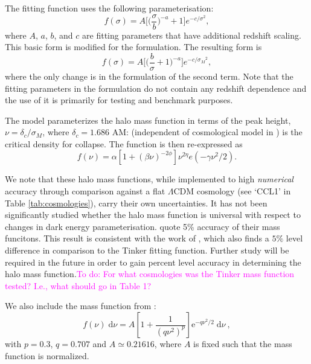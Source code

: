 \documentclass[\docopts]{\docclass}
\newcommand{\todo}[1]{\textcolor{magenta}{To do: #1}}
\newcommand{\elisa}[1]{\textcolor{green!10!orange!90!}{EC: #1}}
\newcommand{\Mead}[1]{\textcolor{red!50!cyan}{AM: #1}}
\begin{document}
The \citet{Tinker2008} fitting function uses the following parameterisation:
\begin{equation}
f(\sigma)=A\Big[\Big(\frac{\sigma}{b}\Big)^{-a}+1\Big]e^{-c/{\sigma}^2},
\end{equation}
where $A$, $a$, $b$, and $c$ are fitting parameters that have additional redshift scaling. This basic form is modified for the \citet{Angulo2012} formulation. The resulting form is
\begin{equation}
f(\sigma)=A\Big[\Big(\frac{b}{\sigma}+1\Big)^{-a}\Big]e^{-c/{\sigma_M}^2},
\end{equation}
where the only change is in the formulation of the second term. Note that the fitting parameters in the \citet{Angulo2012} formulation do not contain any redshift dependence and the use of it is primarily for testing and benchmark purposes.

The \citet{Tinker2010} model parameterizes the halo mass function in terms of the peak height, $\nu = \delta_c/\sigma_M$, where $\delta_c=1.686$ \Mead{(independent of cosmological model in \cite{Tinker2010})} is the critical density for collapse. The function is then re-expressed as
\begin{equation}
  f(\nu) = \alpha[1+(\beta\nu)^{-2\phi}]\nu^{2\eta}e(-\gamma\nu^2/2).
  \label{eq:tinkerf}
\end{equation}

We note that these halo mass functions, while implemented to high {\em numerical} accuracy through comparison against a flat $\Lambda$CDM cosmology (see `CCL1' in Table  \ref{tab:cosmologies}), carry their own uncertainties. It has not been significantly studied whether the halo mass function is universal with respect to changes in dark energy parameterisation.
\citet{Tinker2008,Tinker2010} quote 5\% accuracy of their mass funcitons.
This result is consistent with the work of \citet{Watson2013}, which also finds a $5\%$ level difference in comparison to the Tinker fitting function. Further study will be required in the future in order to gain percent level accuracy in determining the halo mass function.\todo{For what cosmologies was the Tinker mass function tested? I.e., what should go in Table 1?}


We also include the mass function from \cite{Sheth1999}:
\begin{equation}
f(\nu)\;\mathrm{d}\nu=A\left[1+\frac{1}{(q\nu^2)^p}\right]\mathrm{e}^{-q\nu^2/2}\;\mathrm{d}\nu\ ,
\label{eq:st_mf}
\end{equation}
with $p=0.3$, $q=0.707$ and $A\simeq 0.21616$, where $A$ is fixed such that the mass function is normalized.
\end{document}
